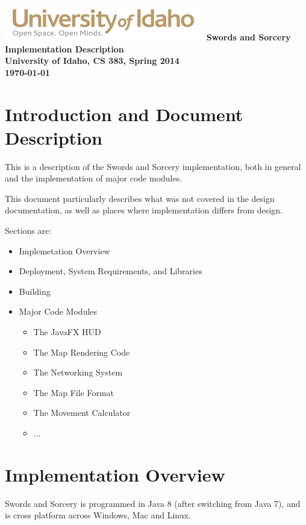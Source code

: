\documentclass[12pt,a4paper]{article}
\begin{document}
\begin{titlepage}
    \centering
    \vfill
    \vfill
    \includegraphics{UIGraphic}
    \vfill
    {\bfseries\Large
        Swords and Sorcery Implementation Description\\
        University of Idaho, CS 383, Spring 2014\\
        \today
    }    
    \vfill
\end{titlepage}
\section{Introduction and Document Description}
This is a description of the Swords and Sorcery implementation, both in general
and the implementation of major code modules.

This document particularly describes what was not covered in the design
documentation, as well as places where implementation differs from design.

Sections are:
\begin{itemize}
\item Implemetation Overview
\item Deployment, System Requirements, and Libraries
\item Building
\item Major Code Modules
\begin{itemize}
	\item The JavaFX HUD	
	\item The Map Rendering Code
	\item The Networking System
	\item The Map File Format
	\item The Movement Calculator
	\item ...
\end{itemize}
\end{itemize}

\section{Implementation Overview}
Swords and Sorcery is programmed in Java 8 (after switching from Java 7),
and is cross platform across Windows, Mac and Linux.
\end{document}
